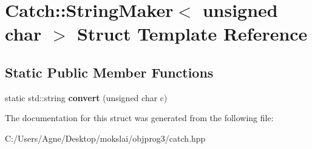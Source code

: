 \hypertarget{struct_catch_1_1_string_maker_3_01unsigned_01char_01_4}{}\section{Catch\+:\+:String\+Maker$<$ unsigned char $>$ Struct Template Reference}
\label{struct_catch_1_1_string_maker_3_01unsigned_01char_01_4}
\subsection*{Static Public Member Functions}
\begin{DoxyCompactItemize}
\item 
\mbox{\label{struct_catch_1_1_string_maker_3_01unsigned_01char_01_4_a7cddb1df26275b9a8e631466eb122f59}} 
static std\+::string {\bfseries convert} (unsigned char c)
\end{DoxyCompactItemize}


The documentation for this struct was generated from the following file\+:\begin{DoxyCompactItemize}
\item 
C\+:/\+Users/\+Agne/\+Desktop/mokslai/objprog3/catch.\+hpp\end{DoxyCompactItemize}
